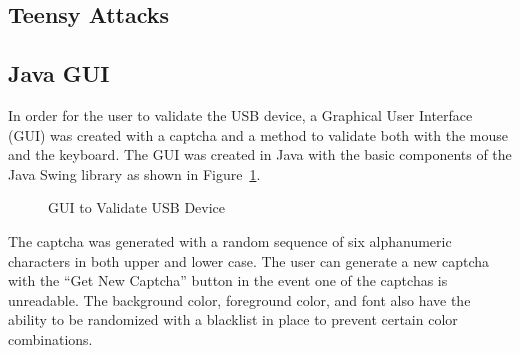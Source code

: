 \documentclass[pagenumbers]{ieee}
\begin{document}
\subsection{Teensy Attacks}


\subsection{Java GUI}

In order for the user to validate the USB device, a Graphical User Interface (GUI) was created with a captcha and a method to validate both with the mouse and the keyboard. The GUI was created in Java with the basic components of the Java Swing \cite{kim} library as shown in Figure~\ref{fig:JavaGUI}.

\begin{figure}[H]
	\caption{GUI to Validate USB Device}
	\label{fig:JavaGUI}
\end{figure}

The captcha was generated with a random sequence of six alphanumeric characters in both upper and lower case. The user can generate a new captcha with the ``Get New Captcha'' button in the event one of the captchas is unreadable. The background color, foreground color, and font also have the ability to be randomized with a blacklist in place to prevent certain color combinations.
\end{document}
